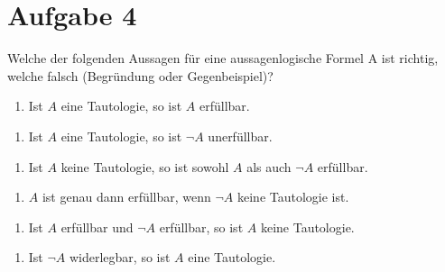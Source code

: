 \section*{Aufgabe 4}

Welche der folgenden Aussagen für eine aussagenlogische Formel A ist richtig, welche falsch (Begründung oder Gegenbeispiel)?

\begin{enumerate}[label={a)}, leftmargin=*]
\item Ist $A$ eine Tautologie, so ist $A$ erfüllbar.
\end{enumerate}

\begin{enumerate}[label={b)}, leftmargin=*]
\item Ist $A$ eine Tautologie, so ist $\lnot A$ unerfüllbar.
\end{enumerate}


\begin{enumerate}[label={c)}, leftmargin=*]
\item Ist $A$ keine Tautologie, so ist sowohl $A$ als auch $\lnot A$ erfüllbar.
\end{enumerate}


\begin{enumerate}[label={d)}, leftmargin=*]
\item $A$ ist genau dann erfüllbar, wenn $\lnot A$ keine Tautologie ist.
\end{enumerate}


\begin{enumerate}[label={e)}, leftmargin=*]
\item Ist $A$ erfüllbar und $\lnot A$ erfüllbar, so ist $A$ keine Tautologie.
\end{enumerate}


\begin{enumerate}[label={f)}, leftmargin=*]
\item Ist $\lnot A$ widerlegbar, so ist $A$ eine Tautologie.
\end{enumerate}